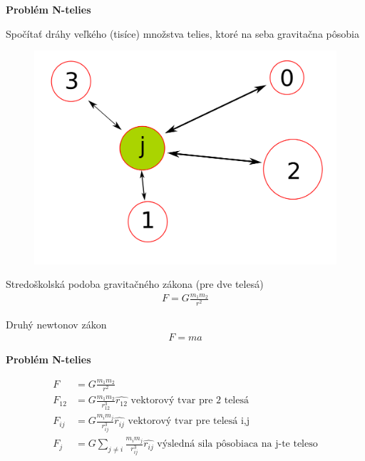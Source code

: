 \documentclass[xcolor=dvipsnames]{beamer}
\begin{document}
\begin{frame}{\bf Problém N-telies}

Spočítať dráhy veľkého (tisíce) množstva telies, ktoré na seba gravitačna pôsobia

\begin{figure}[htbp]
  \centering
    \includegraphics[scale=0.15]{n_body_problem.png}
\end{figure}

Stredoškolská podoba gravitačného zákona (pre dve telesá)
\begin{align*}
F = G\frac {m_1m_2}{r^2}
\end{align*}

Druhý newtonov zákon
\begin{align*}
F = ma
\end{align*}

\end{frame}



\begin{frame}{\bf Problém N-telies}

\begin{align*}
F &= G\frac {m_1m_2}{r^2} \\
F_{12} &= G\frac {m_1m_2}{r_{12}^3}\hat{r_{12}} \text{ vektorový tvar pre 2 telesá}\\
F_{ij} &= G\frac {m_im_j}{r_{ij}^3}\hat{r_{ij}} \text{ vektorový tvar pre telesá i,j}\\
F_{j} &= G \sum_{j \neq i} \frac {m_im_j}{r_{ij}^3}\hat{r_{ij}} \text{ výsledná sila pôsobiaca na j-te teleso}\\
\end{align*}

\end{frame}
\end{document}
